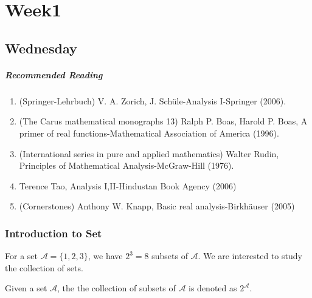 
\chapter{Week1}

\section{Wednesday}
 
\paragraph{Recommended Reading}
\begin{enumerate}
\item
(Springer-Lehrbuch) V. A. Zorich, J. Schüle-Analysis I-Springer (2006).
\item
(The Carus mathematical monographs 13) Ralph P. Boas, Harold P. Boas, A primer of real functions-Mathematical Association of America (1996).
\item
(International series in pure and applied mathematics) Walter Rudin, Principles of Mathematical Analysis-McGraw-Hill (1976).
\item
Terence Tao, Analysis I,II-Hindustan Book Agency (2006)
\item
(Cornerstones) Anthony W. Knapp, Basic real analysis-Birkhäuser (2005)
\end{enumerate}
\subsection{Introduction to Set}
For a set $\mathcal{A}=\{1,2,3\}$, we have $2^3=8$ subsets of $\mathcal{A}$. We are interested to study the collection of sets.
\begin{definition}
Given a set $\mathcal{A}$, the the collection of subsets of $\mathcal{A}$ is denoted as $2^{\mathcal{A}}$.
\end{definition}

